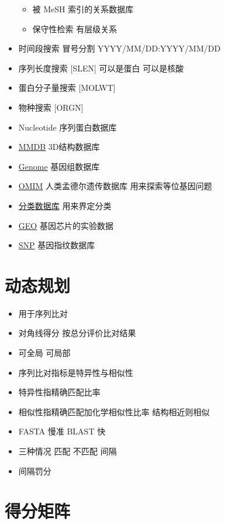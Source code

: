 \documentclass[
]{book}
\providecommand{\tightlist}{%
  \setlength{\itemsep}{0pt}\setlength{\parskip}{0pt}}
\begin{document}
\begin{itemize}
  \begin{itemize}
  \tightlist
  \item
    被 MeSH 索引的关系数据库
  \item
    保守性检索 有层级关系
  \end{itemize}
\item
  时间段搜索 冒号分割 YYYY/MM/DD:YYYY/MM/DD
\item
  序列长度搜索 {[}SLEN{]} 可以是蛋白 可以是核酸
\item
  蛋白分子量搜索 {[}MOLWT{]}
\item
  物种搜索 {[}ORGN{]}
\item
  Nucleotide 序列蛋白数据库
\item
  \href{http://www.ncbi.nlm.nih.gov/structure/}{MMDB} 3D结构数据库
\item
  \href{http://www.ncbi.nlm.nih.gov/genome/}{Genome} 基因组数据库
\item
  \href{http://omim.org/}{OMIM} 人类孟德尔遗传数据库 用来探索等位基因问题
\item
  \href{http://www.ncbi.nlm.nih.gov/taxonomy}{分类数据库} 用来界定分类
\item
  \href{http://www.ncbi.nlm.nih.gov/geo/}{GEO} 基因芯片的实验数据
\item
  \href{http://www.ncbi.nlm.nih.gov/snp/}{SNP} 基因指纹数据库
\end{itemize}

\hypertarget{ux52a8ux6001ux89c4ux5212}{%
\section{动态规划}\label{ux52a8ux6001ux89c4ux5212}}

\begin{itemize}
\tightlist
\item
  用于序列比对
\item
  对角线得分 按总分评价比对结果
\item
  可全局 可局部
\item
  序列比对指标是特异性与相似性
\item
  特异性指精确匹配比率
\item
  相似性指精确匹配加化学相似性比率 结构相近则相似
\item
  FASTA 慢准 BLAST 快
\item
  三种情况 匹配 不匹配 间隔
\item
  间隔罚分
\end{itemize}

\hypertarget{ux5f97ux5206ux77e9ux9635}{%
\section{得分矩阵}\label{ux5f97ux5206ux77e9ux9635}}
\end{document}
